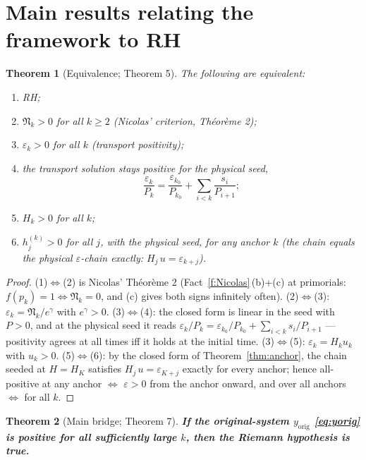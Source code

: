 \documentclass[11pt]{article}
\newtheorem{theorem}{Theorem}[section]
\theoremstyle{remark}
\newcommand{\uk}{u_k}
\newcommand{\eps}{\varepsilon}
\newcommand{\Nn}{\mathfrak{N}}
\newcommand{\gam}{\gamma}
\begin{document}
\section{Main results relating the framework to RH}\label{sec:main}

\begin{theorem}[Equivalence; Theorem 5]\label{thm:equiv}
The following are equivalent:
\begin{enumerate}
\item \textup{RH};
\item $\Nn_k>0$ for all $k\ge2$ (Nicolas' criterion, Th\'eor\`eme 2);
\item $\eps_k>0$ for all $k$ (transport positivity);
\item the transport solution stays positive for the physical seed,
\[
\frac{\eps_k}{P_k}=\frac{\eps_{k_0}}{P_{k_0}}+\sum_{i<k}\frac{s_i}{P_{i+1}};
\]
\item $H_k>0$ for all $k$;
\item $h^{(k)}_j>0$ for all $j$, with the physical seed, for any anchor $k$
(the chain equals the physical $\eps$-chain exactly: $H_j\,u=\eps_{k+j}$).
\end{enumerate}
\end{theorem}

\begin{proof}
(1)$\iff$(2) is Nicolas' Th\'eor\`eme 2 (Fact~\ref{f:Nicolas}\,(b)+(c) at
primorials: $f(p_k)=1\iff\Nn_k=0$, and (c) gives both signs infinitely often).
(2)$\iff$(3): $\eps_k=\Nn_k/e^\gam$ with $e^\gam>0$.
(3)$\iff$(4): the closed form is linear in the seed with $P>0$, and at the
physical seed it reads
$\eps_k/P_k=\eps_{k_0}/P_{k_0}+\sum_{i<k}s_i/P_{i+1}$ --- positivity agrees at
all times iff it holds at the initial time.
(3)$\iff$(5): $\eps_k=H_k\uk$ with $\uk>0$.
(5)$\iff$(6): by the closed form of Theorem~\ref{thm:anchor}, the chain seeded
at $H=H_K$ satisfies $H_j\,u=\eps_{K+j}$ exactly for every anchor; hence
all-positive at any anchor $\iff$ $\eps>0$ from the anchor onward, and over
all anchors $\iff$ for all $k$.
\end{proof}

\begin{theorem}[Main bridge; Theorem 7]\label{thm:bridge}
\textbf{If the original-system $y_{\mathrm{orig}}$ \eqref{eq:yorig} is positive
for all sufficiently large $k$, then the Riemann hypothesis is true.}
\end{theorem}
\end{document}
